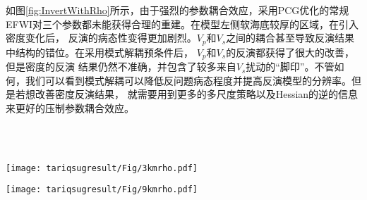 如图\ref{fig:InvertWithRho}所示，由于强烈的参数耦合效应，采用PCG优化的常规EFWI对三个参数都未能获得合理的重建。在模型左侧软海底较厚的区域，在引入密度变化后，
反演的病态性变得更加剧烈。$V_p$和$V_s$之间的耦合甚至导致反演结果中结构的错位。在采用模式解耦预条件后， $V_p$和$V_s$的反演都获得了很大的改善，但是密度的反演
结果仍然不准确，并包含了较多来自$V_s$扰动的“脚印”。不管如何，我们可以看到模式解耦可以降低反问题病态程度并提高反演模型的分辨率。但是若想改善密度反演结果，
就需要用到更多的多尺度策略以及Hessian的逆的信息来更好的压制参数耦合效应。
\begin{figure*}
    \begin{center}
    \caption{
                The true (a) and initial (b) density Marmousi-II model.
    }
    \label{fig:Marrho}
    \end{center}
\end{figure*}
\begin{figure*}
    \begin{center}
        \\
        \\
        \caption{Comparison between conventional and MD-based method with density
            variation: (a) - (c) are the inverted $V_p$, $V_s$ and $\rho$ with
            conventional method, (d) - (f) are the inverted $V_p$, $V_s$ and $\rho$
            with MD-based method. }
    \label{fig:InvertWithRho}
    \end{center}
\end{figure*} 
\begin{figure*}
    \begin{center}
        {\texttt{[image: tariqsugresult/Fig/3kmrho.pdf]}}
        \caption{
        The velocity and density profiles at 3.0 km (a, b)  with the true models
            (black),
            the initial models (blue), the PCG-based (yellow) and MD-based (green)
            inverted models.
    }
    \label{fig:RhoProfile3km}
    \end{center}
\end{figure*}
\begin{figure*}
    \begin{center}
        {\texttt{[image: tariqsugresult/Fig/9kmrho.pdf]}}
        \caption{
        The velocity and density profiles at 9.0 km (a, b)  with the true models
            (black),
            the initial models (blue), the PCG-based (yellow) and MD-based (green)
            inverted models.
    }
    \label{fig:RhoProfile9km}
    \end{center}
\end{figure*} 

